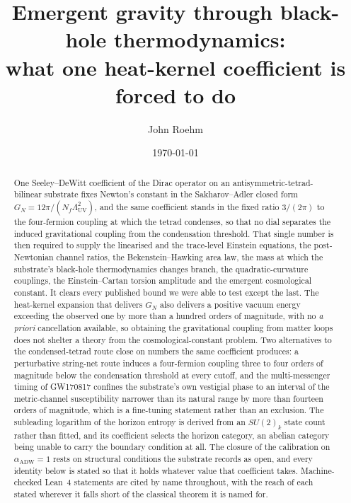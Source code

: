\documentclass[aps,prd,nofootinbib,superscriptaddress,12pt]{revtex4-2}
\begin{document}
\title{Emergent gravity through black-hole thermodynamics:\\
what one heat-kernel coefficient is forced to do}

\author{John Roehm}

\date{\today}

\begin{abstract}
One Seeley--DeWitt coefficient of the Dirac operator on an
antisymmetric-tetrad-bilinear substrate fixes Newton's constant in the
Sakharov--Adler closed form $G_N = 12\pi/(N_f\Lambda_{\mathrm{UV}}^{2})$, and
the same coefficient stands in the fixed ratio $3/(2\pi)$ to the four-fermion
coupling at which the tetrad condenses, so that no dial separates the induced
gravitational coupling from the condensation threshold. That single number is
then required to supply the linearised and the trace-level Einstein equations,
the post-Newtonian channel ratios, the Bekenstein--Hawking area law, the mass at
which the substrate's black-hole thermodynamics changes branch, the
quadratic-curvature couplings, the Einstein--Cartan torsion amplitude and the
emergent cosmological constant. It clears every published bound we were able to
test except the last. The heat-kernel expansion that delivers $G_N$ also
delivers a positive vacuum energy exceeding the observed one by more than a
hundred orders of magnitude, with no \emph{a priori} cancellation available, so
obtaining the gravitational coupling from matter loops does not shelter a theory
from the cosmological-constant problem. Two alternatives to the condensed-tetrad
route close on numbers the same coefficient produces: a perturbative string-net
route induces a four-fermion coupling three to four orders of magnitude below
the condensation threshold at every cutoff, and the multi-messenger timing of
GW170817 confines the substrate's own vestigial phase to an interval of the
metric-channel susceptibility narrower than its natural range by more than
fourteen orders of magnitude, which is a fine-tuning statement rather than an
exclusion. The subleading logarithm of the horizon entropy is derived from an
$SU(2)_k$ state count rather than fitted, and its coefficient selects the
horizon category, an abelian category being unable to carry the boundary
condition at all. The closure of the calibration on $\alpha_{\mathrm{ADW}} = 1$
rests on structural conditions the substrate records as open, and every identity
below is stated so that it holds whatever value that coefficient takes.
Machine-checked Lean~4 statements are cited by name throughout, with the reach
of each stated wherever it falls short of the classical theorem it is named for.
\end{abstract}
\end{document}
